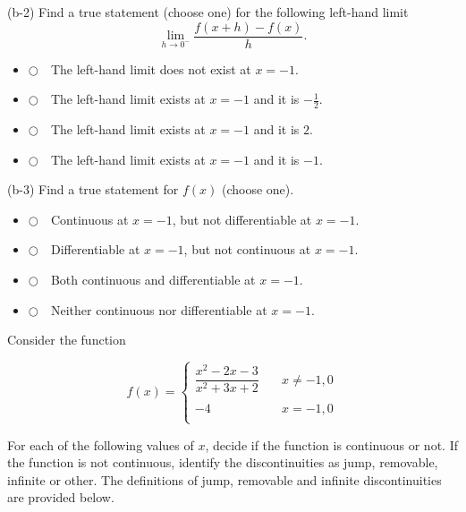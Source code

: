 \documentclass[addpoints,12pt]{exam}
\newcommand{\chooseone}{{\Large$\Circle$\ \ }}
\begin{document}
\begin{questions}
\begin{parts}
 \bigskip

(b-2) Find a true statement (choose one) for the following left-hand limit $$\lim_{h \rightarrow
0^-} \frac{f(x+ h)- f(x)}{h}.$$

  \begin{itemize}[label={}]
\item \chooseone The left-hand limit does not exist at $x=-1$.
\item \chooseone The left-hand limit exists at $x=-1$ and it is $- \frac{1}{2}$.
\item \chooseone The left-hand limit exists at $x=-1$ and it is $2$.
\item \chooseone The left-hand limit exists at $x=-1$ and it is $-1$.
\end{itemize}




 \bigskip

(b-3) Find a true statement for $f(x)$ (choose one).




  \begin{itemize}[label={}]
\item \chooseone Continuous at $x =-1$, but not differentiable at $x =-1.$
\item \chooseone Differentiable at $x =-1$, but not continuous at $x =-1.$
\item \chooseone Both continuous and differentiable at $x =-1.$
\item \chooseone Neither continuous nor differentiable at $x =-1.$
\end{itemize}




 \vfill

\end{parts}

\newpage

\question Consider the function


$$ f(x) = \left\{
     \begin{array}{ll}
        \dfrac{x^2-2x-3}{x^2+3x+2} & \quad x \neq -1, 0 \\
        \\
         -4 & \quad x = -1, 0 \\

      \end{array}
  \right. $$

\bigskip
For each of the following values of $x$, decide if the function is continuous or not. If the function
is not continuous, identify the discontinuities as jump, removable, infinite or other. The
definitions of jump, removable and infinite discontinuities are provided below.


\end{questions}
\end{document}
